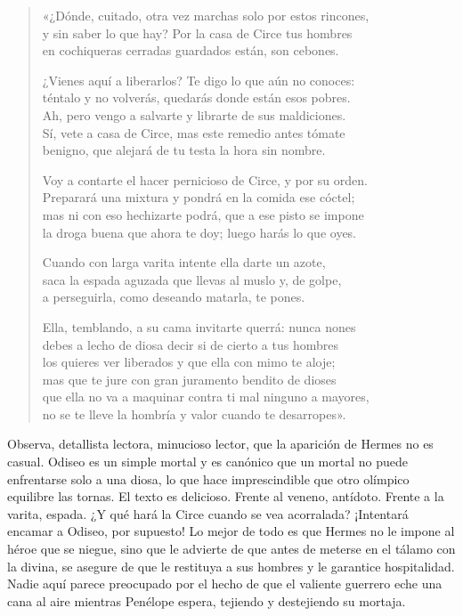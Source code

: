 \documentclass[11pt,a4paper]{article}
\begin{document}
\begin{verse}
«¿Dónde, cuitado, otra vez marchas solo por estos rincones,\\
y sin saber lo que hay? Por la casa de Circe tus hombres\\
en cochiqueras cerradas guardados están, son cebones.

¿Vienes aquí a liberarlos? Te digo lo que aún no conoces:\\
téntalo y no volverás, quedarás donde están esos pobres.\\
Ah, pero vengo a salvarte y librarte de sus maldiciones.\\
Sí, vete a casa de Circe, mas este remedio antes tómate\\
benigno, que alejará de tu testa la hora sin nombre.

Voy a contarte el hacer pernicioso de Circe, y por su orden.\\
Preparará una mixtura y pondrá en la comida ese cóctel;\\
mas ni con eso hechizarte podrá, que a ese pisto se impone\\
la droga buena que ahora te doy; luego harás lo que oyes.

Cuando con larga varita intente ella darte un azote,\\
saca la espada aguzada que llevas al muslo y, de golpe,\\
a perseguirla, como deseando matarla, te pones.

Ella, temblando, a su cama invitarte querrá: nunca nones\\
debes a lecho de diosa decir si de cierto a tus hombres\\
los quieres ver liberados y que ella con mimo te aloje;\\
mas que te jure con gran juramento bendito de dioses\\
que ella no va a maquinar contra ti mal ninguno a mayores,\\
no se te lleve la hombría y valor cuando te desarropes».
\end{verse}

Observa, detallista lectora, minucioso lector, que la aparición de Hermes no es casual. Odiseo es un simple mortal y es canónico que un mortal no puede enfrentarse solo a una diosa, lo que hace imprescindible que otro olímpico equilibre las tornas. El texto es delicioso. Frente al veneno, antídoto. Frente a la varita, espada. ¿Y qué hará la Circe cuando se vea acorralada? ¡Intentará encamar a Odiseo, por supuesto! Lo mejor de todo es que Hermes no le impone al héroe que se niegue, sino que le advierte de que antes de meterse en el tálamo con la divina, se asegure de que le restituya a sus hombres y le garantice hospitalidad. Nadie aquí parece preocupado por el hecho de que el valiente guerrero eche una cana al aire mientras Penélope espera, tejiendo y destejiendo su mortaja.
\end{document}
